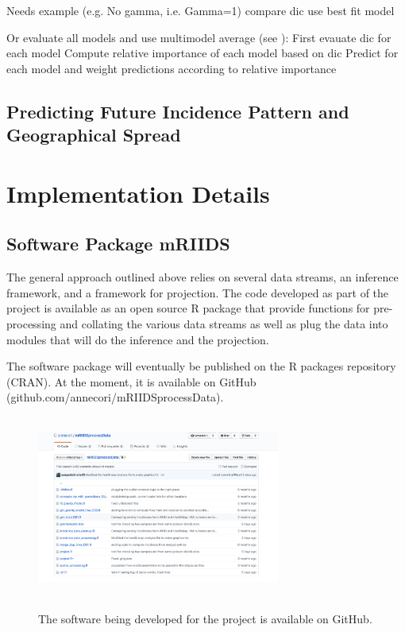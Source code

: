 \documentclass[11pt,]{article}
\begin{document}
Needs example (e.g. No gamma, i.e. Gamma=1) compare dic use best fit model

Or evaluate all models and use multimodel average (see \cite{burnham2011aic}):  
First evauate dic for each model
Compute relative importance of each model based on dic
Predict for each model and weight predictions according to relative importance



\subsection{Predicting Future Incidence Pattern and Geographical Spread}

\section{Implementation Details}
\subsection{Software Package mRIIDS}

The general approach outlined above relies on several data streams, an
inference framework, and a framework for projection. The code
developed as part of the project is available as an open
source R package that provide functions for pre-processing and
collating the various data streams as well as plug the data into
modules that will do the inference and the projection. 

The software
package will eventually be published on the R packages repository
(CRAN). At the moment, it is available on GitHub (github.com/annecori/mRIIDSprocessData).

\begin{figure}
   \centering
  \includegraphics[width=8cm, height = 6cm]{ms6-figures/github-screenshot}
  \label{fig:github}
  \caption{The software being developed for the project is available
    on GitHub.}
\end{figure}
\end{document}
